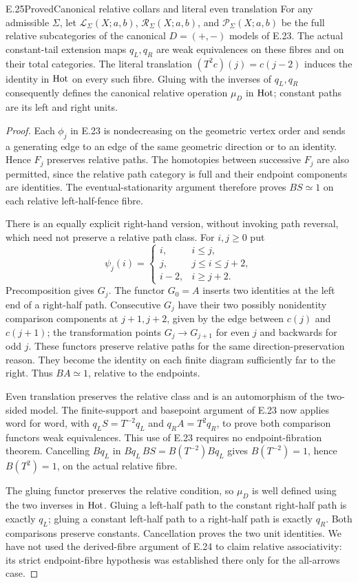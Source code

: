 \begin{claim}{E.25}{Proved}{Canonical relative collars and literal even translation}
For any admissible $\Sigma$, let $\mathcal L_\Sigma(X;a,b)$, $\mathcal R_\Sigma(X;a,b)$, and $\mathcal P_\Sigma(X;a,b)$ be the full relative subcategories of the canonical $D=(+,-)$ models of E.23. The actual constant-tail extension maps $q_L,q_R$ are weak equivalences on these fibres and on their total categories. The literal translation $(T^2c)(j)=c(j-2)$ induces the identity in $\mathrm{Hot}$ on every such fibre. Gluing with the inverses of $q_L,q_R$ consequently defines the canonical relative operation $\mu_D$ in $\mathrm{Hot}$; constant paths are its left and right units.
\end{claim}
\begin{proof}
Each $\phi_j$ in E.23 is nondecreasing on the geometric vertex order and sends a generating edge to an edge of the same geometric direction or to an identity. Hence $F_j$ preserves relative paths. The homotopies between successive $F_j$ are also permitted, since the relative path category is full and their endpoint components are identities. The eventual-stationarity argument therefore proves $BS\simeq1$ on each relative left-half-fence fibre.

There is an equally explicit right-hand version, without invoking path reversal, which need not preserve a relative path class. For $i,j\geq0$ put
\[
 \psi_j(i)=
 \begin{cases}
 i,&i\leq j,\\
 j,&j\leq i\leq j+2,\\
 i-2,&i\geq j+2.
 \end{cases}
\]
Precomposition gives $G_j$. The functor $G_0=A$ inserts two identities at the left end of a right-half path. Consecutive $G_j$ have their two possibly nonidentity comparison components at $j+1,j+2$, given by the edge between $c(j)$ and $c(j+1)$; the transformation points $G_j\to G_{j+1}$ for even $j$ and backwards for odd $j$. These functors preserve relative paths for the same direction-preservation reason. They become the identity on each finite diagram sufficiently far to the right. Thus $BA\simeq1$, relative to the endpoints.

Even translation preserves the relative class and is an automorphism of the two-sided model. The finite-support and basepoint argument of E.23 now applies word for word, with $q_LS=T^{-2}q_L$ and $q_RA=T^2q_R$, to prove both comparison functors weak equivalences. This use of E.23 requires no endpoint-fibration theorem. Cancelling $Bq_L$ in $Bq_L\,BS=B(T^{-2})Bq_L$ gives $B(T^{-2})=1$, hence $B(T^2)=1$, on the actual relative fibre.

The gluing functor preserves the relative condition, so $\mu_D$ is well defined using the two inverses in $\mathrm{Hot}$. Gluing a left-half path to the constant right-half path is exactly $q_L$; gluing a constant left-half path to a right-half path is exactly $q_R$. Both comparisons preserve constants. Cancellation proves the two unit identities. We have not used the derived-fibre argument of E.24 to claim relative associativity: its strict endpoint-fibre hypothesis was established there only for the all-arrows case.
\end{proof}

